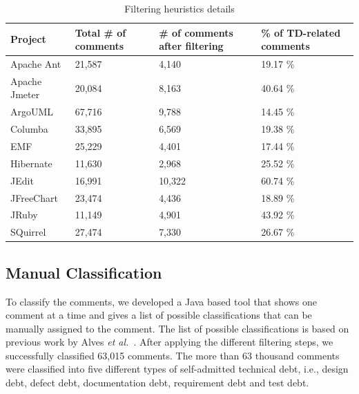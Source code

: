 \begin{table}[!hbt]
      \begin{center}
            \caption{Filtering heuristics details}
            \label{tab:filtering_heuristics_details}
            \begin{tabular}{l| p{0.55in} p{0.60in} p{0.61in} }
            \toprule
            \textbf{Project}   & \textbf{Total \# of comments}  & \textbf{\# of comments after filtering} & \textbf{\%  of TD-related comments}\\ \midrule 
              Apache Ant       & 21,587                & 4,140                   & 19.17 \% \\ 
              Apache Jmeter    & 20,084                & 8,163                   & 40.64 \% \\
              ArgoUML          & 67,716                & 9,788                   & 14.45 \% \\              
              Columba          & 33,895                & 6,569                   & 19.38 \% \\
              EMF              & 25,229                & 4,401                   & 17.44 \% \\
              Hibernate        & 11,630                & 2,968                   & 25.52 \% \\              
              JEdit            & 16,991                & 10,322                  & 60.74 \% \\
              JFreeChart       & 23,474                & 4,436                   & 18.89 \% \\ 
              JRuby            & 11,149                & 4,901                   & 43.92 \% \\ 
              SQuirrel         & 27,474                & 7,330                   & 26.67 \% \\ \bottomrule
            \end{tabular}
      \end{center}
\end{table}

\subsection{Manual Classification} %
\label{sub:manual_classification}

To classify the comments, we developed a Java based tool that shows one comment at a time and gives a list of possible classifications that can be manually assigned to the comment. The list of possible classifications is based on previous work by Alves \textit{et al.}~\cite{Alves2014MTD}. After applying the different filtering steps, we successfully classified 63,015 comments. The more than 63 thousand comments were classified into five different types of self-admitted technical debt, i.e., design debt, defect debt, documentation debt, requirement debt and test debt.
 
